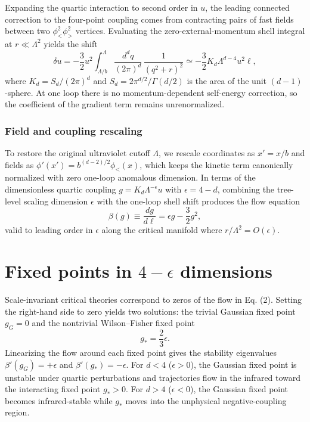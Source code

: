 \documentclass{article}
\begin{document}
Expanding the quartic interaction to second order in $u$, the leading connected
correction to the four-point coupling comes from contracting pairs of fast fields
between two $\phi_{<}^2 \phi_{>}^2$ vertices. Evaluating the zero-external-momentum
shell integral at $r \ll \Lambda^2$ yields the shift
\[
  \delta u = -\frac{3}{2} u^2 \int_{\Lambda/b}^{\Lambda} \frac{d^d q}{(2\pi)^d}\,\frac{1}{(q^2 + r)^2}
  \simeq -\frac{3}{2} K_d \Lambda^{d-4} u^2 \ell,
\]
where $K_d = S_d / (2\pi)^d$ and $S_d = 2\pi^{d/2}/\Gamma(d/2)$ is the area of the
unit $(d-1)$-sphere. At one loop there is no momentum-dependent self-energy
correction, so the coefficient of the gradient term remains unrenormalized.

\subsubsection{Field and coupling rescaling}\label{subsubsec:rescaling}

To restore the original ultraviolet cutoff $\Lambda$, we rescale coordinates as
$x' = x / b$ and fields as $\phi'(x') = b^{(d-2)/2} \phi_{<}(x)$, which keeps the
kinetic term canonically normalized with zero one-loop anomalous dimension. In
terms of the dimensionless quartic coupling $g = K_d \Lambda^{-\epsilon} u$ with
$\epsilon = 4 - d$, combining the tree-level scaling dimension $\epsilon$ with the
one-loop shell shift produces the flow equation
\begin{equation}\label{eq:beta}
  \beta(g) \equiv \frac{dg}{d\ell} = \epsilon g - \frac{3}{2} g^2,
\end{equation}
valid to leading order in $\epsilon$ along the critical manifold where $r / \Lambda^2 = O(\epsilon)$.

\section{Fixed points in $4-\epsilon$ dimensions}\label{sec:fixedpoints}

Scale-invariant critical theories correspond to zeros of the flow in Eq. (2).
Setting the right-hand side to zero yields two solutions: the trivial Gaussian
fixed point $g_G = 0$ and the nontrivial Wilson--Fisher fixed point
\begin{equation}\label{eq:wf-fp}
  g_* = \frac{2}{3}\epsilon.
\end{equation}
Linearizing the flow around each fixed point gives the stability eigenvalues
$\beta'(g_G) = +\epsilon$ and $\beta'(g_*) = -\epsilon$. For $d < 4$ ($\epsilon > 0$),
the Gaussian fixed point is unstable under quartic perturbations and trajectories
flow in the infrared toward the interacting fixed point $g_* > 0$. For $d > 4$
($\epsilon < 0$), the Gaussian fixed point becomes infrared-stable while $g_*$
moves into the unphysical negative-coupling region.
\end{document}
